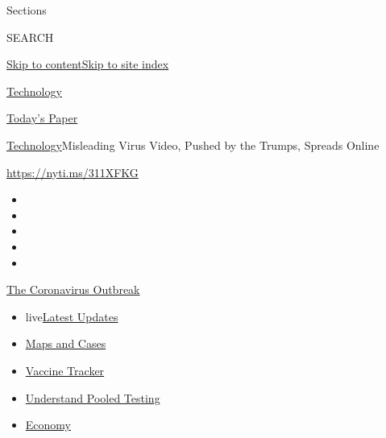 Sections

SEARCH

\protect\hyperlink{site-content}{Skip to
content}\protect\hyperlink{site-index}{Skip to site index}

\href{https://web.archive.org/web/20200728210031/https://www.nytimes.com/section/technology}{Technology}

\href{https://web.archive.org/web/20200728210031/https://myaccount.nytimes.com/auth/login?response_type=cookie\&client_id=vi}{}

\href{https://web.archive.org/web/20200728210031/https://www.nytimes.com/section/todayspaper}{Today's
Paper}

\href{/web/20200728210031/https://www.nytimes.com/section/technology}{Technology}\textbar{}Misleading
Virus Video, Pushed by the Trumps, Spreads Online

\url{https://nyti.ms/311XFKG}

\begin{itemize}
\item
\item
\item
\item
\item
\end{itemize}

\href{https://web.archive.org/web/20200728210031/https://www.nytimes.com/news-event/coronavirus?action=click\&pgtype=Article\&state=default®ion=TOP_BANNER\&context=storylines_menu}{The
Coronavirus Outbreak}

\begin{itemize}
\tightlist
\item
  live\href{https://web.archive.org/web/20200728210031/https://www.nytimes.com/2020/07/28/world/coronavirus-covid-19.html?action=click\&pgtype=Article\&state=default®ion=TOP_BANNER\&context=storylines_menu}{Latest
  Updates}
\item
  \href{https://web.archive.org/web/20200728210031/https://www.nytimes.com/interactive/2020/us/coronavirus-us-cases.html?action=click\&pgtype=Article\&state=default®ion=TOP_BANNER\&context=storylines_menu}{Maps
  and Cases}
\item
  \href{https://web.archive.org/web/20200728210031/https://www.nytimes.com/interactive/2020/science/coronavirus-vaccine-tracker.html?action=click\&pgtype=Article\&state=default®ion=TOP_BANNER\&context=storylines_menu}{Vaccine
  Tracker}
\item
  \href{https://web.archive.org/web/20200728210031/https://www.nytimes.com/interactive/2020/07/27/upshot/coronavirus-pooled-testing.html?action=click\&pgtype=Article\&state=default®ion=TOP_BANNER\&context=storylines_menu}{Understand
  Pooled Testing}
\item
  \href{https://web.archive.org/web/20200728210031/https://www.nytimes.com/live/2020/07/28/business/stock-market-today-coronavirus?action=click\&pgtype=Article\&state=default®ion=TOP_BANNER\&context=storylines_menu}{Economy}
\end{itemize}


